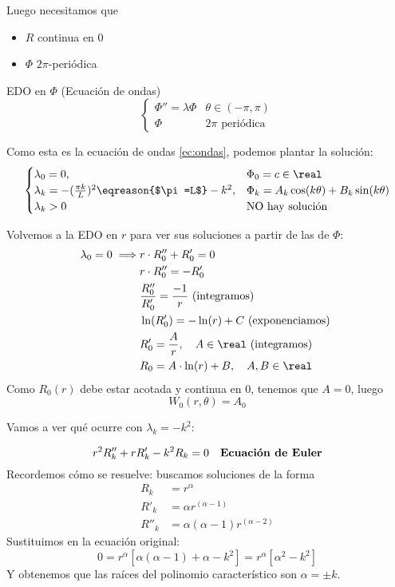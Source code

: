 		Luego necesitamos que
		\begin{itemize}
			\item $R$ continua en 0
			\item $\Phi$ $2\pi$-periódica
		\end{itemize}


		EDO en $\Phi$ (Ecuación de ondas)
		\[
			\begin{cases}
				\Phi'' = \lambda \Phi & \theta \in (-\pi, \pi) \\
				\Phi & 2\pi \text{ periódica }
			\end{cases}
		\]

		Como esta es la ecuación de ondas \ref{ec:ondas}, podemos plantar la solución:
		\[
			\begin{cases}
				\lambda_0 = 0,& \Phi_0 = c \in \real\\
				\lambda_k = -(\frac{\pi k}{L})^2 \eqreason{$\pi=L$} -k^2, & \Phi_k = A_k \cos (k\theta) + B_k \sin (k\theta)\\
				\lambda_k > 0 & \text{NO hay solución}
			\end{cases}
		\]

		Volvemos a la EDO en $r$ para ver sus soluciones a partir de las de $\Phi$:
		\begin{align*}
			\lambda_0 = 0 \implies & r\cdot R_0'' + R'_0 = 0\\
			& r\cdot R_0'' = - R'_0\\
			& \frac{R''_0}{R'_0} = \frac{-1}{r} \text{ (integramos) }\\
			& \ln(R'_0) = - \ln(r) + C \text{ (exponenciamos) }\\
			& R'_0 = \frac{A}{r}, \quad A \in \real \text{ (integramos) }\\
			& R_0 = A \cdot \ln(r) + B, \quad A,B \in \real
		\end{align*}
		Como $R_0(r)$ debe estar acotada y continua en 0, tenemos que $A = 0$, luego $$W_{0}(r, \theta) = A_0$$

		Vamos a ver qué ocurre con $\lambda_k = -k^2$:

		\[r^2 R''_k + r R'_k - k^2 R_k = 0 \quad \text{\bf Ecuación de Euler}\]
		Recordemos cómo se resuelve: buscamos soluciones de la forma
		\begin{align*}
			R_k &= r^\alpha \\
			R'_k &= \alpha r^(\alpha - 1) \\
			R''_k &= \alpha(\alpha-1)r^(\alpha - 2)
		\end{align*}
		Sustituimos en la ecuación original:
		\[ 0 = r^\alpha [\alpha(\alpha -1)+ \alpha - k^2] = r^\alpha [\alpha^2 - k^2] \]
		Y obtenemos que las raíces del polinomio característico son $\alpha = ± k$.

